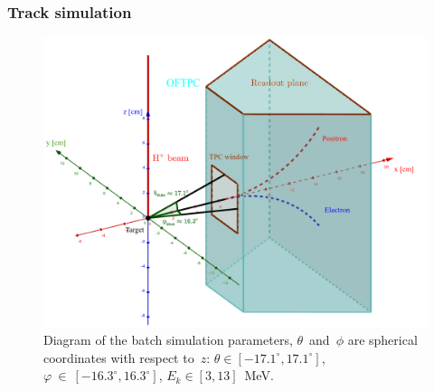 \documentclass{beamer}
\begin{document}
	\begin{frame}
		\frametitle{Track simulation}
		\begin{minipage}[t][\textheight]{0.93\textwidth}
			\begin{figure}
				\centering
				\includegraphics[height= 0.65 \textheight]{../images/tpc_micro_simulation.png}
				\caption{Diagram of the batch simulation parameters, $\theta$~and~$\phi$ are spherical coordinates with respect to~$z$: $\theta\in[-17.1^\circ,17.1^\circ]$, $\varphi~\in~[-16.3^\circ,16.3^\circ]$, $ E_k \in [3,13] $~MeV.}
			\end{figure}
		\end{minipage}
	\end{frame}
	
\end{document}
